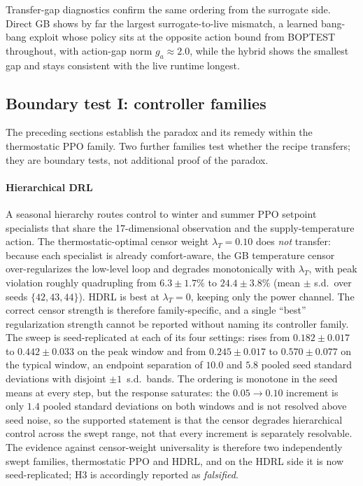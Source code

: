 Transfer-gap diagnostics confirm the same ordering from the surrogate side. Direct GB shows by far
the largest surrogate-to-live mismatch, a learned bang-bang exploit whose policy sits at the
opposite action bound from BOPTEST throughout, with action-gap norm $g_a\approx2.0$, while the
hybrid shows the smallest gap and stays consistent with the live runtime longest.

\subsection{Boundary test I: controller families}\label{sec:families}

The preceding sections establish the paradox and its remedy within the thermostatic PPO family. Two
further families test whether the recipe transfers; they are boundary tests, not additional proof of
the paradox.

\paragraph{Hierarchical DRL}
A seasonal hierarchy routes control to winter and summer PPO setpoint specialists that share the
17-dimensional observation and the supply-temperature action. The thermostatic-optimal censor weight
$\lambda_T=0.10$ does \emph{not} transfer: because each specialist is already comfort-aware, the GB
temperature censor over-regularizes the low-level loop and \ms{} degrades monotonically with
$\lambda_T$, with peak violation roughly quadrupling from $6.3\pm1.7\%$ to $24.4\pm3.8\%$
(mean $\pm$ s.d.\ over seeds $\{42,43,44\}$). HDRL is best at
$\lambda_T=0$, keeping only the power channel. The correct censor strength is therefore
family-specific, and a single ``best'' regularization strength cannot be reported without naming its
controller family. The sweep is seed-replicated at each of its four settings: \ms{} rises from
$0.182\pm0.017$ to $0.442\pm0.033$ on the peak window and from $0.245\pm0.017$ to
$0.570\pm0.077$ on the typical window, an endpoint separation of $10.0$ and $5.8$ pooled seed
standard deviations with disjoint $\pm1$~s.d.\ bands. The ordering is monotone in the seed means at
every step, but the response saturates: the $0.05\rightarrow0.10$ increment is only $1.4$ pooled
standard deviations on both windows and is not resolved above seed noise, so the supported statement
is that the censor degrades hierarchical control across the swept range, not that every increment is
separately resolvable. The evidence against censor-weight universality is therefore two
independently swept families, thermostatic PPO and HDRL, and on the HDRL side it is now
seed-replicated; H3 is accordingly reported as \emph{falsified}.

